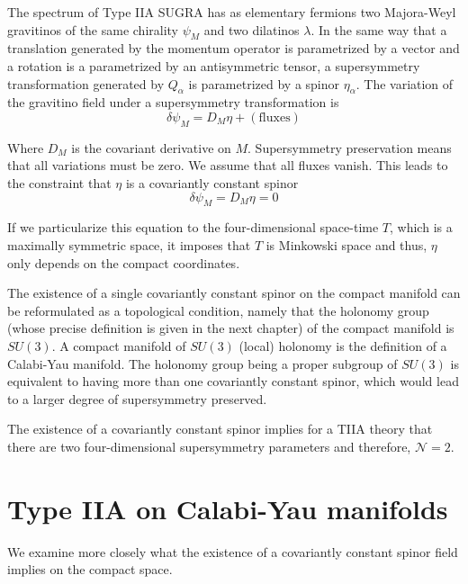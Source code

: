 The spectrum of Type IIA SUGRA has as elementary fermions two Majora-Weyl gravitinos of the same chirality $\psi_M$ and two dilatinos $\lambda$. 
In the same way that a translation generated by the momentum operator is parametrized by a vector and
a rotation is a parametrized by an antisymmetric tensor, a supersymmetry transformation generated
by $Q_\alpha$ is parametrized 
by a spinor $\eta_\alpha$.
The variation of the gravitino field under a supersymmetry transformation is
\begin{equation}
  \delta \psi_M = D_M \eta + \mathrm{(fluxes)}
\end{equation}

Where $D_M$ is the covariant derivative on $M$.
Supersymmetry preservation means that all variations must be zero. 
We assume that all fluxes vanish.
This leads to the constraint that $\eta$ is a covariantly constant spinor
\begin{equation}
  \delta \psi_M = D_M \eta = 0
\end{equation}

If we particularize this equation to the four-dimensional space-time  $T$, which is a maximally symmetric space, 
it imposes that $T$ is Minkowski space and thus, $\eta$ only depends on the compact coordinates.


The existence of a single covariantly constant spinor on the compact manifold can be reformulated
as a topological condition, namely that the holonomy group (whose precise definition is given in the next chapter) of the compact manifold is $SU(3)$.
A compact manifold of $SU(3)$ (local) holonomy is the definition of a Calabi-Yau manifold.
The holonomy group being a proper subgroup of $SU(3)$ is equivalent to having more than one covariantly 
constant spinor, which would lead to a larger degree of supersymmetry preserved.

The existence of a covariantly constant spinor implies  for a TIIA theory that there are two four-dimensional supersymmetry parameters and therefore, $\mathcal N =2$.

\section{Type IIA on Calabi-Yau manifolds}
We examine more closely what the existence of a covariantly constant spinor field implies on the compact space. 

